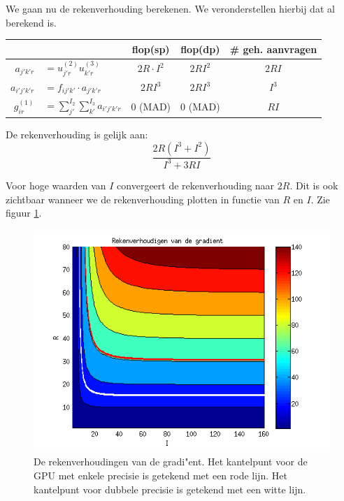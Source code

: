 We gaan nu de rekenverhouding berekenen. We veronderstellen hierbij dat \FF al berekend is.

\begin{tabular}{|r l|c| c|c|}
\hline
					&			& flop(sp)			& flop(dp) 			& \# geh. aanvragen	\\
\hline
$a_{j'k'r}$	&$= u^{(2)}_{j'r} u^{(3)}_{k'r}$%
								& $2 R \cdot I^2$	& $2 R I^2$			&	$2 R I$			\\
$a_{i'j'k'r}$	&$= f_{ij'k'} \cdot a_{j'k'r}$%
								& $2 R I^3$			& $2 R I^3$			&	$I^3$			\\
$g^{(1)}_{ir}$	&$= \sum_{j'}^{I_2}\sum_{k'}^{I_3}a_{i'j'k'r}$%
								& 0 (MAD)			& 0 (MAD)			&	$R I$			\\
\hline
\end{tabular}

De rekenverhouding is gelijk aan:
\[
	\frac{2R(I^3 + I^2)}{I^3 + 3RI}
\]

Voor hoge waarden van $I$ convergeert de rekenverhouding naar $2R$. Dit is ook zichtbaar wanneer we de rekenverhouding plotten in functie van $R$ en $I$. Zie figuur \ref{haalG}.

\begin{figure}
\centering
\includegraphics{haalG}
\caption{\label{haalG}De rekenverhoudingen van de gradi"ent. Het kantelpunt voor de GPU met enkele precisie is getekend met een rode lijn. Het kantelpunt voor dubbele precisie is getekend met een witte lijn.}
\end{figure}

